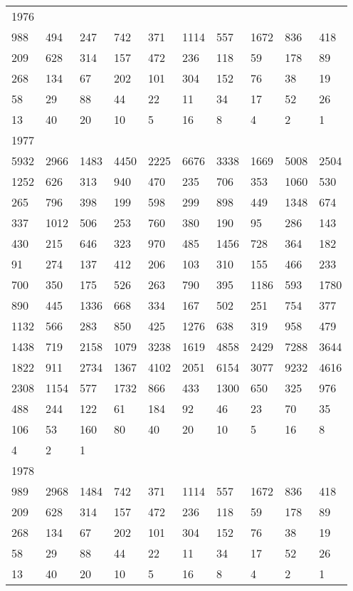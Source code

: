 \begin{longtable}{*{10}{l}}
1976&&&&&&&&&\\
988& 494& 247& 742& 371& 1114& 557& 1672& 836& 418\\
209& 628& 314& 157& 472& 236& 118& 59& 178& 89\\
268& 134& 67& 202& 101& 304& 152& 76& 38& 19\\
58& 29& 88& 44& 22& 11& 34& 17& 52& 26\\
13& 40& 20& 10& 5& 16& 8& 4& 2& 1\\

1977&&&&&&&&&\\
5932& 2966& 1483& 4450& 2225& 6676& 3338& 1669& 5008& 2504\\
1252& 626& 313& 940& 470& 235& 706& 353& 1060& 530\\
265& 796& 398& 199& 598& 299& 898& 449& 1348& 674\\
337& 1012& 506& 253& 760& 380& 190& 95& 286& 143\\
430& 215& 646& 323& 970& 485& 1456& 728& 364& 182\\
91& 274& 137& 412& 206& 103& 310& 155& 466& 233\\
700& 350& 175& 526& 263& 790& 395& 1186& 593& 1780\\
890& 445& 1336& 668& 334& 167& 502& 251& 754& 377\\
1132& 566& 283& 850& 425& 1276& 638& 319& 958& 479\\
1438& 719& 2158& 1079& 3238& 1619& 4858& 2429& 7288& 3644\\
1822& 911& 2734& 1367& 4102& 2051& 6154& 3077& 9232& 4616\\
2308& 1154& 577& 1732& 866& 433& 1300& 650& 325& 976\\
488& 244& 122& 61& 184& 92& 46& 23& 70& 35\\
106& 53& 160& 80& 40& 20& 10& 5& 16& 8\\
4& 2& 1& \\

1978&&&&&&&&&\\
989& 2968& 1484& 742& 371& 1114& 557& 1672& 836& 418\\
209& 628& 314& 157& 472& 236& 118& 59& 178& 89\\
268& 134& 67& 202& 101& 304& 152& 76& 38& 19\\
58& 29& 88& 44& 22& 11& 34& 17& 52& 26\\
13& 40& 20& 10& 5& 16& 8& 4& 2& 1\\


\end{longtable}
